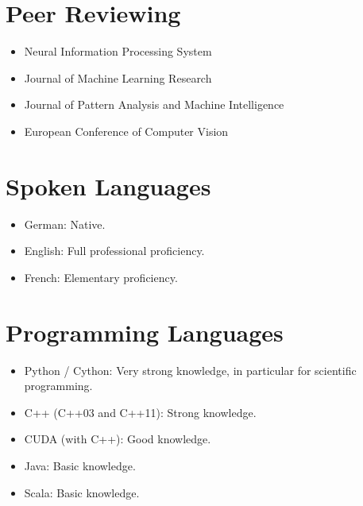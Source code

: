\documentclass[a4paper,11pt]{article}
\begin{document}
\section{Peer Reviewing}
\begin{itemize}
    \item Neural Information Processing System
    \item Journal of Machine Learning Research
    \item Journal of Pattern Analysis and Machine Intelligence
    \item European Conference of Computer Vision
\end{itemize}

\section{Spoken Languages}
\begin{itemize}
    \item German: Native.
    \item English: Full professional proficiency.
    \item French: Elementary proficiency.
\end{itemize}

\section{Programming Languages}
\begin{itemize}
    \item Python / Cython: Very strong knowledge, in particular for scientific programming.
    \item C++ (C++03 and C++11): Strong knowledge.
    \item CUDA (with C++): Good knowledge.
    \item Java: Basic knowledge.
    \item Scala: Basic knowledge.
\end{itemize}

\begin{publications}
\end{publications}
\end{document}
